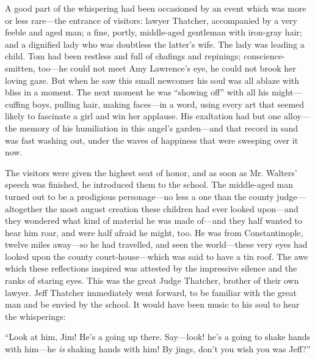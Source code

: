 \documentclass{book}
\begin{document}
A good part of the whispering had been occasioned by an event which was more or less rare—the entrance of visitors: lawyer Thatcher, accompanied by a very feeble and aged man; a fine, portly, middle-aged gentleman with iron-gray hair; and a dignified lady who was doubtless the latter’s wife. The lady was leading a child. Tom had been restless and full of chafings and repinings; conscience-smitten, too—he could not meet Amy Lawrence’s eye, he could not brook her loving gaze. But when he saw this small newcomer his soul was all ablaze with bliss in a moment. The next moment he was “showing off” with all his might—cuffing boys, pulling hair, making faces—in a word, using every art that seemed likely to fascinate a girl and win her applause. His exaltation had but one alloy—the memory of his humiliation in this angel’s garden—and that record in sand was fast washing out, under the waves of happiness that were sweeping over it now.

The visitors were given the highest seat of honor, and as soon as Mr. Walters’ speech was finished, he introduced them to the school. The middle-aged man turned out to be a prodigious personage—no less a one than the county judge—altogether the most august creation these children had ever looked upon—and they wondered what kind of material he was made of—and they half wanted to hear him roar, and were half afraid he might, too. He was from Constantinople, twelve miles away—so he had travelled, and seen the world—these very eyes had looked upon the county court-house—which was said to have a tin roof. The awe which these reflections inspired was attested by the impressive silence and the ranks of staring eyes. This was the great Judge Thatcher, brother of their own lawyer. Jeff Thatcher immediately went forward, to be familiar with the great man and be envied by the school. It would have been music to his soul to hear the whisperings:

“Look at him, Jim! He’s a going up there. Say—look! he’s a going to shake hands with him—he \emph{is} shaking hands with him! By jings, don’t you wish you was Jeff?”
\end{document}
